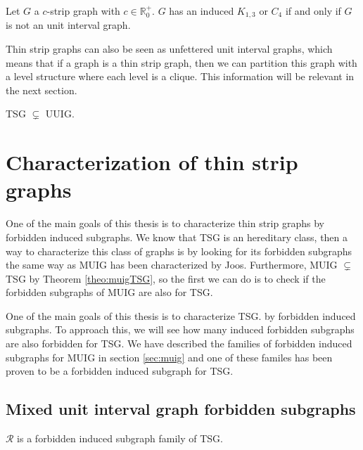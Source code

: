 \begin{theorem}
  \label{theo:induced_TSG}
  Let $G$ a $c$-strip graph with $c \in \mathbb{R}_0^+$. $G$ has an induced $K_{1,3}$ or $C_4$ if and only if $G$ is not an unit interval graph.
\end{theorem}

Thin strip graphs can also be seen as unfettered unit interval graphs, which means that if a graph is a thin strip graph, then we can partition this graph with a level structure where each level is a clique. This information will be relevant in the next section.

\begin{theorem}
  TSG $\subsetneq$ UUIG.
\end{theorem}



\section{Characterization of thin strip graphs}

One of the main goals of this thesis is to characterize thin strip graphs by forbidden induced subgraphs. We know that TSG is an hereditary class, then a way to characterize this class of graphs is by looking for its forbidden subgraphs the same way as MUIG has been characterized by Joos. Furthermore, MUIG $\subsetneq$ TSG by Theorem \ref{theo:muigTSG}, so the first we can do is to check if the forbidden subgraphs of MUIG are also for TSG.

One of the main goals of this thesis is to characterize TSG. by forbidden induced subgraphs. To approach this, we will see how many induced forbidden subgraphs are also forbidden for TSG. We have described the families of forbidden induced subgraphs for MUIG in section \ref{sec:muig} and one of these familes has been proven to be a forbidden induced subgraph for TSG.

\subsection{Mixed unit interval graph forbidden subgraphs}

\begin{theorem}
  $\mathcal{R}$ is a forbidden induced subgraph family of TSG.
\end{theorem}

